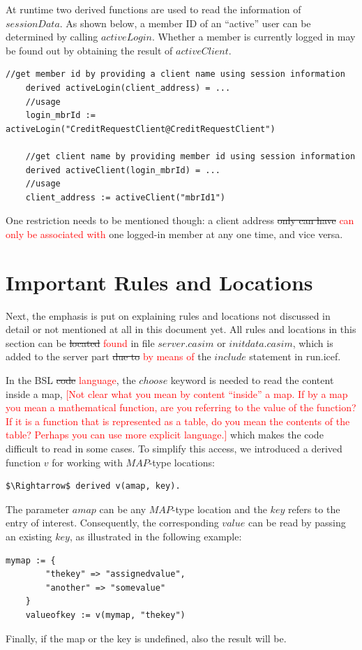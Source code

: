 At runtime two derived functions are used to read the information of $sessionData$. As shown below, a member ID of an ``active'' user can be determined by calling $activeLogin$. Whether a member is currently logged in may be found out by obtaining the result of $activeClient$.

\begin{lstlisting}[language=bsl]
	//get member id by providing a client name using session information
	derived activeLogin(client_address) = ...
	//usage
	login_mbrId := activeLogin("CreditRequestClient@CreditRequestClient")
	
	//get client name by providing member id using session information
	derived activeClient(login_mbrId) = ...
	//usage
	client_address := activeClient("mbrId1")
\end{lstlisting}

One restriction needs to be mentioned though: a client address \st{only can have} \textcolor{red}{can only be associated with} one logged-in member at any one time, and vice versa.

\section{Important Rules and Locations}
\label{sec:impl-rules}

Next, the emphasis is put on explaining rules and locations not discussed in detail or not mentioned at all in this document yet. All rules and locations in this section can be \st{located} \textcolor{red}{found} in file $server.casim$ or $initdata.casim$, which is added to the server part \st{due to} \textcolor{red}{by means of} the $include$ statement in run.icef.

In the BSL \st{code} \textcolor{red}{language}, the $choose$ keyword is needed to read the content inside a map, 
\textcolor{red}{[Not clear what you mean by content ``inside'' a map. If by a map you mean a mathematical function, are you referring to the value of the function? If it is a function that is represented as a table, do you mean the contents of the table? Perhaps you can use more explicit language.]} which makes the code difficult to read in some cases. To simplify this access, we introduced a derived function $v$ for working with $MAP$-type locations:
\begin{lstlisting}[language=bsl,mathescape=true]
	$\Rightarrow$ derived v(amap, key).
\end{lstlisting}

The parameter $amap$ can be any $MAP$-type location and the $key$ refers to the entry of interest. Consequently, the corresponding $value$ can be read by passing an existing $key$, as illustrated in the following example:
\begin{lstlisting}[language=bsl,mathescape=true]
	mymap := {
		"thekey" => "assignedvalue",
		"another" => "somevalue"		
	}
	valueofkey := v(mymap, "thekey")
\end{lstlisting}
Finally, if the map or the key is undefined, also the result will be.

